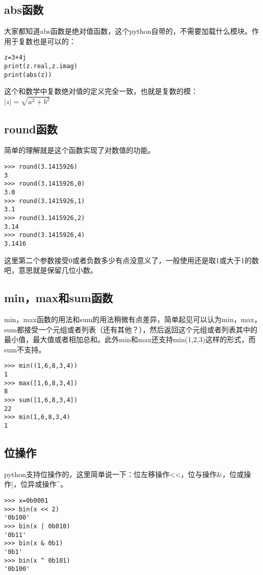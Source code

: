 \documentclass[12pt,oneside]{book}
\begin{document}
\begin{common-format}
\subsection{abs函数}
大家都知道abs函数是绝对值函数，这个python自带的，不需要加载什么模块。作用于复数也是可以的：
\begin{Verbatim}
z=3+4j
print(z.real,z.imag)
print(abs(z))
\end{Verbatim}

这个和数学中复数绝对值的定义完全一致，也就是复数的模：\\
$ \left| z \right| =\sqrt { a^{ 2 }+b^{ 2 } }  $

\subsection{round函数}
简单的理解就是这个函数实现了对数值的功能。
\begin{Verbatim}
>>> round(3.1415926)
3
>>> round(3.1415926,0)
3.0
>>> round(3.1415926,1)
3.1
>>> round(3.1415926,2)
3.14
>>> round(3.1415926,4)
3.1416
\end{Verbatim}

这里第二个参数接受0或者负数多少有点没意义了，一般使用还是取1或大于1的数吧，意思就是保留几位小数。


\subsection{min，max和sum函数}
\label{sec:sum函数}
min，max函数的用法和sum的用法稍微有点差异，简单起见可以认为min，max，sum都接受一个元组或者列表（还有其他？），然后返回这个元组或者列表其中的最小值，最大值或者相加总和。此外min和max还支持min(1,2,3)这样的形式，而sum不支持。
\begin{Verbatim}
>>> min((1,6,8,3,4))
1
>>> max([1,6,8,3,4])
8
>>> sum([1,6,8,3,4])
22
>>> min(1,6,8,3,4)
1
\end{Verbatim}



\subsection{位操作}
python支持位操作的，这里简单说一下：位左移操作<<，位与操作\&{}，位或操作|，位异或操作\^{}。
\begin{Verbatim}
>>> x=0b0001
>>> bin(x << 2)
'0b100'
>>> bin(x | 0b010)
'0b11'
>>> bin(x & 0b1)
'0b1'
>>> bin(x ^ 0b101)
'0b100'
\end{Verbatim}





\end{common-format}
\end{document}
